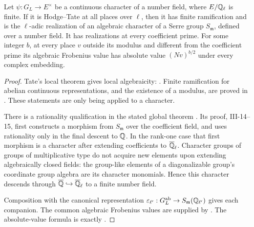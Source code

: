 \begin{lemma}\label{lem:frey-rank-one-weights}
Let \(\psi:G_L\to E^\times\) be a continuous character of a number field,
where \(E/\mathbb Q_\ell\) is finite. If it is Hodge--Tate at all places over
\(\ell\), then it has finite ramification and is the \(\ell\)-adic
realization of an algebraic character of a Serre group
\(S_{\mathfrak m}\), defined over a number field.
It has realizations at every coefficient prime.
For some integer \(b\), at every place \(v\) outside its modulus and
different from the coefficient prime its algebraic Frobenius value has
absolute value \((Nv)^{b/2}\) under every complex embedding.
\end{lemma}
\begin{proof}
Tate's local theorem gives local algebraicity:
\cite[III \S1.2, III-7]{Serre1989}.
Finite ramification for abelian continuous representations, and the
existence of a modulus, are proved in
\cite[III \S2.2, III-10--11]{Serre1989}.
These statements are only being applied to a character.

There is a rationality qualification in the stated global theorem
\cite[III \S2.3, Theorem~2, III-13]{Serre1989}.
Its proof, III-14--15, first constructs a morphism from
\(S_{\mathfrak m}\) over the coefficient field, and uses rationality only
in the final descent to \(\mathbb Q\).
In the rank-one case that first morphism is a character after extending
coefficients to \(\overline{\mathbb Q}_\ell\).
Character groups of groups of multiplicative type do not acquire new
elements upon extending algebraically closed fields: the group-like
elements of a diagonalizable group's coordinate group algebra are its
character monomials. Hence this character descends through
\(\overline{\mathbb Q}\hookrightarrow\overline{\mathbb Q}_\ell\) to a finite number field.

Composition with the canonical representation
\(\varepsilon_{\ell'}:G_L^{\mathrm{ab}}\to
S_{\mathfrak m}(\mathbb Q_{\ell'})\) gives each companion. The common algebraic
Frobenius values are supplied by
\cite[II \S2.5, proposition, II-18--19]{Serre1989}.
The absolute-value formula is exactly
\cite[II \S3.4, Proposition~2, II-37--38]{Serre1989}.
\end{proof}

